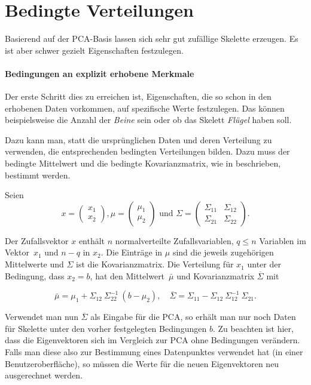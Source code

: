  
 \clearpage
 \section{Bedingte Verteilungen}
 \label{pca_conditions}
 
 Basierend auf der PCA-Basis lassen sich sehr gut zufällige Skelette erzeugen. Es ist aber schwer gezielt Eigenschaften festzulegen.
 
 \paragraph{Bedingungen an explizit erhobene Merkmale}
 Der erste Schritt dies zu erreichen ist, Eigenschaften, die so schon in den erhobenen Daten vorkommen, auf spezifische Werte festzulegen. Das können beispielsweise die Anzahl der \emph{Beine} sein oder ob das Skelett \emph{Flügel} haben soll.
 
 Dazu kann man, statt die ursprünglichen Daten und deren Verteilung zu verwenden, die entsprechenden bedingten Verteilungen bilden. Dazu muss der bedingte Mittelwert und die bedingte Kovarianzmatrix, wie in \cite[S.\ $116$ f.]{conditionalDistribution} beschrieben, bestimmt werden.
 
 Seien 
 \[x = \begin{pmatrix} x_1 \\ x_2 \end{pmatrix}, 
  \mu = \begin{pmatrix} \mu_1 \\ \mu_2 \end{pmatrix} \text{ und }
  \Sigma = \begin{pmatrix} \Sigma_{11} & \Sigma_{12} \\ \Sigma_{21} & \Sigma_{22} \end{pmatrix}. \] 
 
 Der Zufallsvektor $x$ enthält $n$ normalverteilte Zufallsvariablen, $q \le n$ Variablen im \mbox{Vektor $x_1$} und $n - q$ in $x_2$. Die Einträge in $\mu$ sind die jeweils zugehörigen Mittelwerte und $\Sigma$ ist die Kovarianzmatrix. Die Verteilung für $x_1$ unter der Bedingung, dass $x_2 = b$, hat den \mbox{Mittelwert $\bar{\mu}$} und Kovarianzmatrix $\overline{\Sigma}$ mit
 
 \[ \bar{\mu} = \mu_1 + \Sigma_{12}~ \Sigma_{22}^{-1}~ (b - \mu_2), \quad
    \overline{\Sigma} = \Sigma_{11} - \Sigma_{12}~ \Sigma_{12}^{-1}~ \Sigma_{21}. \]
 
 Verwendet man nun $\overline{\Sigma}$ als Eingabe für die PCA, so erhält man nur noch Daten für Skelette unter den vorher festgelegten Bedingungen $b$. Zu beachten ist hier, dass die Eigenvektoren sich im Vergleich zur PCA ohne Bedingungen verändern. Falls man diese also zur Bestimmung eines Datenpunktes verwendet hat (\zb in einer Benutzeroberfläche), so müssen die Werte für die neuen Eigenvektoren neu ausgerechnet werden.
 
